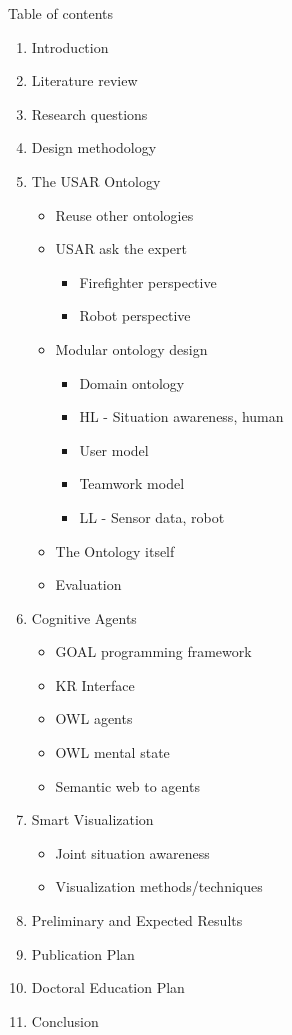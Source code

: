Table of contents
\tableofcontents{}

\begin{enumerate}
\item Introduction
\item Literature review
\item Research questions
\item Design methodology
\item The USAR Ontology
\begin{itemize}
\item Reuse other ontologies
\item USAR ask the expert 
\begin{itemize}
\item Firefighter perspective
\item Robot perspective
\end{itemize}
\item Modular ontology design
\begin{itemize}
\item Domain ontology
\item HL - Situation awareness, human 
\item User model
\item Teamwork model
\item LL - Sensor data, robot
\end{itemize}
\item The Ontology itself
\item Evaluation
\end{itemize}

\item Cognitive Agents
\begin{itemize}
\item GOAL programming framework
\item KR Interface
\item OWL agents
\item OWL mental state
\item Semantic web to agents
\end{itemize}

\item Smart Visualization
\begin{itemize}
\item Joint situation awareness
\item Visualization methods/techniques
\end{itemize}

\item Preliminary and Expected Results
\item Publication Plan
\item Doctoral Education Plan
\item Conclusion
\end{enumerate}
    
    
  
  
  